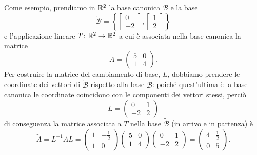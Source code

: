 Come esempio, prendiamo in $\mathbb{R}^2$ la base canonica $\mathcal B$ e la base
\begin{equation}
	\tilde{\mathcal B}=\left\{
		\begin{bmatrix}
			0\\
			-2
		\end{bmatrix},
		\begin{bmatrix}
			1\\
			2
		\end{bmatrix}
	\right\}
\end{equation}
e l'applicazione lineare $T\colon\mathbb{R}^2\to\mathbb{R}^2$ a cui è associata nella base canonica la matrice
\begin{equation}
	A=
	\begin{pmatrix}
		5&0\\
		1&4
	\end{pmatrix}.
\end{equation}
Per costruire la matrice del cambiamento di base, $L$, dobbiamo prendere le coordinate dei vettori di $\tilde{\mathcal B}$ rispetto alla base $\mathcal B$: poich\'e quest'ultima è la base canonica le coordinate coincidono con le componenti dei vettori stessi, perciò
\begin{equation}
	L=
	\begin{pmatrix}
		0&1\\
		-2&2
	\end{pmatrix}
\end{equation}
di conseguenza la matrice associata a $T$ nella base $\tilde{\mathcal B}$ (in arrivo e in partenza) è
\begin{equation}
	\tilde A=L^{-1}AL=
	\begin{pmatrix}
		1&-\frac12\\
		1&0
	\end{pmatrix}
	\begin{pmatrix}
		5&0\\
		1&4
	\end{pmatrix}
	\begin{pmatrix}
		0&1\\
		-2&2
	\end{pmatrix}
	=
	\begin{pmatrix}
		4&\frac12\\
		0&5
	\end{pmatrix}.
\end{equation}

